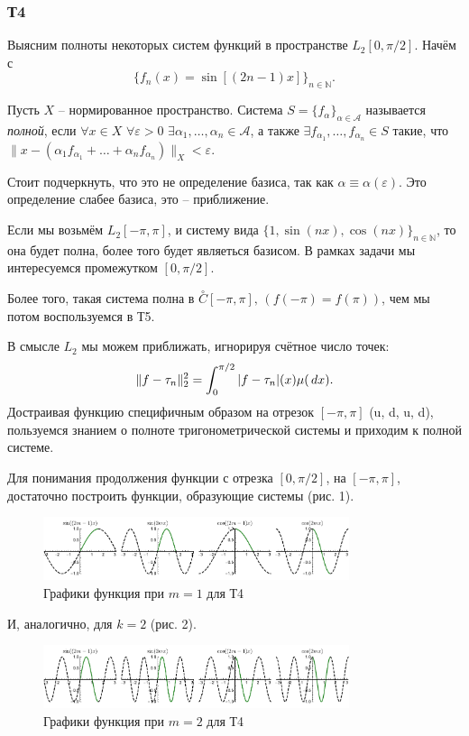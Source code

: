 \subsubsection*{Т4}


Выясним полноты некоторых систем функций в пространстве $L_2[0,\pi/2]$. Начём с 
\begin{equation*}
    \{f_n(x) = \sin[(2n-1)x]\}_{n\in \mathbb{N}}.
\end{equation*}

\begin{to_def}
    Пусть $X$ -- нормированное пространство. Система $S = \{f_\alpha\}_{\alpha\in \mathcal A}$ называется \textit{полной}, если $\forall x \in X$ $\forall \varepsilon > 0$ $\exists \alpha_1, \ldots, \alpha_n \in \mathcal A$, а также $\exists f_{\alpha_1}, \ldots, f_{\alpha_n} \in S$ такие, что $\|x- (\alpha_1 f_{\alpha_1} + \ldots + \alpha_n f_{\alpha_n})\|_X < \varepsilon$.
\end{to_def}

Стоит подчеркнуть, что это не определение базиса, так как $\alpha \equiv \alpha(\varepsilon)$. Это определение слабее базиса, это -- приближение.

Если мы возьмём $L_2[-\pi,\pi]$, и систему вида $\{1, \sin(nx), \cos(nx)\}_{n\in \mathbb{N}}$, то она будет полна, более того будет являеться базисом. В рамках задачи мы интересуемся промежутком $[0, \pi/2]$. 

Более того, такая система полна в $\overset{\circ}{C}[-\pi, \pi],\, (f(-\pi)=f(\pi))$, чем мы потом воспользуемся в Т5.

В смысле $L_2$ мы можем приближать, игнорируя счётное число точек:
\begin{equation*}
    \|f-\tau_n\|_2^2 = \int_0^{\pi/2} |f-\tau_n| (x) \mu(\, d x).
\end{equation*}
Достраивая функцию специфичным образом на отрезок $[-\pi, \pi]$ (u, d, u, d), пользуемся знанием о полноте тригонометрической системы и приходим к полной системе. 

Для понимания продолжения функции с отрезка $[0, \pi/2]$, на $[-\pi, \pi]$, достаточно построить функции, образующие системы (рис. 1). 
\begin{figure}[ht]
    \centering
    \includegraphics[width=0.8\textwidth]{figures/1.pdf}
    \caption{Графики функция при $m=1$ для Т4}
\end{figure}
И, аналогично, для $k=2$ (рис. 2). 
\begin{figure}[ht]
    \centering
    \includegraphics[width=0.8\textwidth]{figures/2.pdf}
    \caption{Графики функция при $m=2$ для Т4}
\end{figure}



